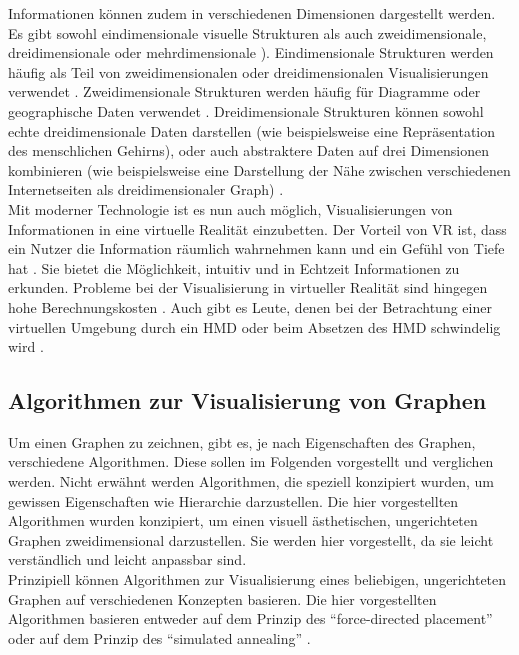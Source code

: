 \documentclass[12pt, a4paper]{article}
\begin{document}
Informationen können zudem in verschiedenen Dimensionen dargestellt werden. Es gibt sowohl eindimensionale visuelle Strukturen als auch zweidimensionale, dreidimensionale oder mehrdimensionale \cite[S.~57f]{card1999readings}). Eindimensionale Strukturen werden häufig als Teil von zweidimensionalen oder dreidimensionalen Visualisierungen verwendet \cite[S.~58]{card1999readings}. Zweidimensionale Strukturen werden häufig für Diagramme oder geographische Daten verwendet \cite[S.~59]{card1999readings}. Dreidimensionale Strukturen können sowohl echte dreidimensionale Daten darstellen (wie beispielsweise eine Repräsentation des menschlichen Gehirns), oder auch abstraktere Daten auf drei Dimensionen kombinieren (wie beispielsweise eine Darstellung der Nähe zwischen verschiedenen Internetseiten als dreidimensionaler Graph) \cite[S.~60]{card1999readings}.\\

Mit moderner Technologie ist es nun auch möglich, Visualisierungen von Informationen in eine virtuelle Realität einzubetten. Der Vorteil von VR ist, dass ein Nutzer die Information räumlich wahrnehmen kann und ein Gefühl von Tiefe hat \cite[S.~64]{bryson1996virtual}. Sie bietet die Möglichkeit, intuitiv und in Echtzeit Informationen zu erkunden. Probleme bei der Visualisierung in virtueller Realität sind hingegen hohe Berechnungskosten \cite[S.~65]{bryson1996virtual}. Auch gibt es Leute, denen bei der Betrachtung einer virtuellen Umgebung durch ein HMD oder beim Absetzen des HMD schwindelig wird \cite[S.~271]{kaufmann2000construct3d}.\\

\newpage
\subsection{Algorithmen zur Visualisierung von Graphen}
Um einen Graphen zu zeichnen, gibt es, je nach Eigenschaften des Graphen, verschiedene Algorithmen. Diese sollen im Folgenden vorgestellt und verglichen werden. Nicht erwähnt werden Algorithmen, die speziell konzipiert wurden, um gewissen Eigenschaften wie Hierarchie darzustellen. Die hier vorgestellten Algorithmen wurden konzipiert, um einen visuell ästhetischen, ungerichteten Graphen zweidimensional darzustellen. Sie werden hier vorgestellt, da sie leicht verständlich und leicht anpassbar sind.\\

Prinzipiell können Algorithmen zur Visualisierung eines beliebigen, ungerichteten Graphen auf verschiedenen Konzepten basieren. Die hier vorgestellten Algorithmen basieren entweder auf dem Prinzip des "`force-directed placement"' \cite{eades1984heuristic} \cite{kamada1989algorithm} \cite{fruchterman1991graph} oder auf dem Prinzip des "`simulated annealing"' \cite{davidson1996drawing}.\\
\end{document}
